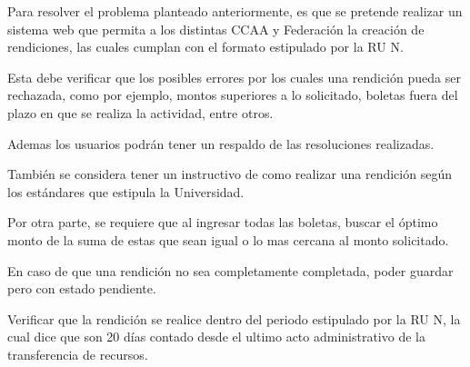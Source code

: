 Para resolver el problema planteado anteriormente, es que se pretende realizar un sistema web que permita a los distintas CCAA y Federación la creación de rendiciones, las cuales cumplan con el formato estipulado por la RU N.

Esta debe verificar que los posibles errores por los cuales una rendición pueda ser rechazada, como por ejemplo, montos superiores a lo solicitado, boletas fuera del plazo en que se realiza la actividad, entre otros.

Ademas los usuarios podrán tener un respaldo de las resoluciones realizadas.

También se considera tener un instructivo de como realizar una rendición según los estándares que estipula la Universidad.   

Por otra parte, se requiere que al ingresar todas las boletas, buscar el óptimo monto de la suma de estas que sean igual o lo mas cercana al monto solicitado.

En caso de que una rendición no sea completamente completada, poder guardar pero con estado pendiente.

Verificar que la rendición se realice dentro del periodo estipulado por la RU N, la cual dice que son 20 días contado desde el ultimo acto administrativo de la transferencia de recursos.